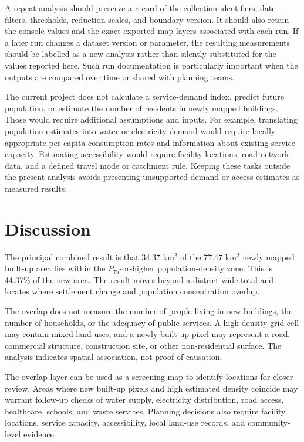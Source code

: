 \documentclass[conference]{IEEEtran}
\begin{document}
A repeat analysis should preserve a record of the collection identifiers, date filters, thresholds, reduction scales, and boundary version. It should also retain the console values and the exact exported map layers associated with each run. If a later run changes a dataset version or parameter, the resulting measurements should be labelled as a new analysis rather than silently substituted for the values reported here. Such run documentation is particularly important when the outputs are compared over time or shared with planning teams.

The current project does not calculate a service-demand index, predict future population, or estimate the number of residents in newly mapped buildings. Those would require additional assumptions and inputs. For example, translating population estimates into water or electricity demand would require locally appropriate per-capita consumption rates and information about existing service capacity. Estimating accessibility would require facility locations, road-network data, and a defined travel mode or catchment rule. Keeping these tasks outside the present analysis avoids presenting unsupported demand or access estimates as measured results.

\section{Discussion}
The principal combined result is that 34.37 km$^2$ of the 77.47 km$^2$ newly mapped built-up area lies within the $P_{75}$-or-higher population-density zone. This is 44.37\% of the new area. The result moves beyond a district-wide total and locates where settlement change and population concentration overlap.

The overlap does not measure the number of people living in new buildings, the number of households, or the adequacy of public services. A high-density grid cell may contain mixed land uses, and a newly built-up pixel may represent a road, commercial structure, construction site, or other non-residential surface. The analysis indicates spatial association, not proof of causation.

The overlap layer can be used as a screening map to identify locations for closer review. Areas where new built-up pixels and high estimated density coincide may warrant follow-up checks of water supply, electricity distribution, road access, healthcare, schools, and waste services. Planning decisions also require facility locations, service capacity, accessibility, local land-use records, and community-level evidence.
\end{document}
